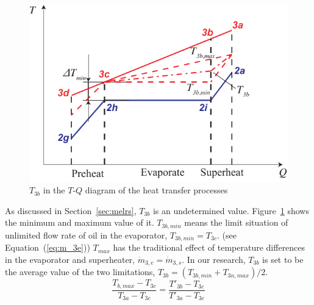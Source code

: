 \noindent \begin{figure}[htbp]
\begin{center}
	\includegraphics[width = 0.7\columnwidth]{fig/T3b}
	\caption{$T_{3b}$ in the $T$-$Q$ diagram of the heat transfer processes}
	\label{fig:T3b}
\end{center}
\end{figure}

As discussed in Section~\ref{sec:melrs}, $T_{3b}$ is an undetermined value. Figure~\ref{fig:T3b} shows the minimum and maximum value of it. $T_{3b,min}$ means the limit situation of unlimited flow rate of oil in the evaporator, $T_{3b,min} = T_{3c}$. (see Equation~(\ref{eq:m_3e})) $T_{max}$ has the traditional effect of temperature differences in the evaporator and superheater, $\dot{m}_{3,e} = \dot{m}_{3,s}$. In our research, $T_{3b}$ is set to be the average value of the two limitations, $T_{3b} = (T_{3b,min} + T_{3n,max}) / 2$.
\begin{equation}
  \dfrac{T_{b,max}-T_{3c}}{T_{3a} - T_{3c}} = \dfrac{T'_{3b} - T_{3c}}{T'_{3a} - T_{3c}}
\end{equation}

